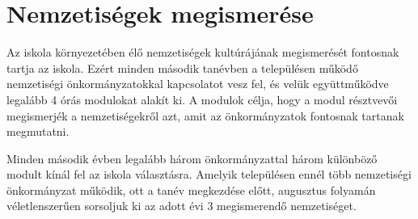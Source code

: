 \hypertarget{nemzetisegek-megismerese}{%
\section{Nemzetiségek megismerése}\label{nemzetisegek-megismerese}}

Az iskola környezetében élő nemzetiségek kultúrájának megismerését
fontosnak tartja az iskola. Ezért minden második tanévben a településen
működő nemzetiségi önkormányzatokkal kapcsolatot vesz fel, és velük
együttműködve legalább 4 órás modulokat alakít ki. A modulok célja, hogy
a modul résztvevői megismerjék a nemzetiségekről azt, amit az
önkormányzatok fontosnak tartanak megmutatni.

Minden második évben legalább három önkormányzattal három különböző
modult kínál fel az iskola választásra. Amelyik településen ennél több
nemzetiségi önkormányzat működik, ott a tanév megkezdése előtt,
augusztus folyamán véletlenszerűen sorsoljuk ki az adott évi 3
megismerendő nemzetiséget.
